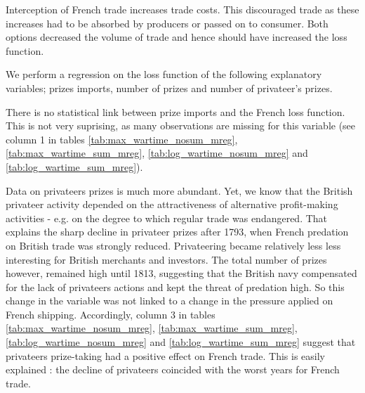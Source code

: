 \documentclass[12pt,a4paper,notitlepage,english]{article}
\begin{document}
Interception of French trade increases trade costs.
This discouraged trade as these increases had to be absorbed by producers or passed on to consumer.
Both options decreased the volume of trade and hence should have increased the loss function.



We perform a regression on the loss function of the following explanatory variables; prizes imports, number of prizes and number of privateer's prizes. 

There is no statistical link between prize imports and the French loss function. This is not very suprising, as many observations are missing for this variable (see column 1 in tables \ref{tab:max_wartime_nosum_mreg},  \ref{tab:max_wartime_sum_mreg}, \ref{tab:log_wartime_nosum_mreg} and   \ref{tab:log_wartime_sum_mreg}).





Data on privateers prizes is much more abundant.
Yet, we know that the British privateer activity depended on the attractiveness of alternative profit-making activities \citep[p. 673]{Villiers2002,Hillmann2011} - e.g. on the degree to which regular trade was endangered. That explains the sharp decline in privateer prizes after 1793, when French predation on British trade was strongly reduced.
Privateering became relatively less less interesting for British merchants and investors.
The total number of prizes however, remained high until 1813, suggesting that the British navy compensated for the lack of privateers actions and kept the threat of predation high.
So this change in the variable was not linked to a change in the pressure applied on French shipping.
Accordingly, column 3 in tables  \ref{tab:max_wartime_nosum_mreg},  \ref{tab:max_wartime_sum_mreg}, \ref{tab:log_wartime_nosum_mreg} and   \ref{tab:log_wartime_sum_mreg}  suggest that privateers prize-taking had a positive effect on French trade.
This is easily explained : the decline of privateers coincided with the worst years for French trade.
\end{document}
